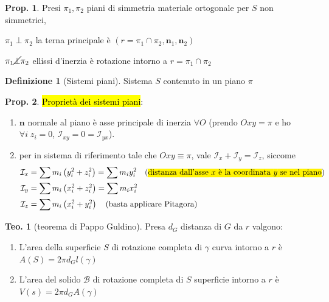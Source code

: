 \documentclass[a4paper,10pt]{article}
\theoremstyle{definition}
\theoremstyle{indentdefinition}
\newtheorem{defn}{Definizione}[section]
\theoremstyle{indenttheorem}
\newtheorem{thm}{Teo.}
\newtheorem{prop}{Prop.}
\theoremstyle{myremark}
\theoremstyle{indentgeneral}
\newenvironment{lyxlist}[1]
	{\begin{list}{}
		{\settowidth{\labelwidth}{#1}
		 \setlength{\leftmargin}{\labelwidth}
		 \addtolength{\leftmargin}{\labelsep}
		 \renewcommand{\makelabel}[1]{##1\hfil}}}
	{\end{list}}
\begin{document}
\begin{prop}
Presi $\pi_{1},\pi_{2}$ piani di simmetria materiale ortogonale per
$S$ non simmetrici,
\end{prop}

\begin{lyxlist}{00.00.0000}
\item [{$\pi_{1}\perp\pi_{2}$}] la terna principale è $\left(r=\pi_{1}\cap\pi_{2},\boldsymbol{n}_{1},\boldsymbol{n}_{2}\right)$
\item [{$\pi_{1}\cancel{\perp}\pi_{2}$}] ellissi d'inerzia è rotazione
intorno a $r=\pi_{1}\cap\pi_{2}$
\end{lyxlist}
\begin{defn}[Sistemi piani]
    Sistema $S$ contenuto in un piano $\pi$
\end{defn}

\begin{prop}
    \hl{Proprietà dei sistemi piani}:
    \begin{enumerate}
        \item $\boldsymbol{n}$ normale al piano è asse principale di inerzia $\forall O$
(prendo $Oxy=\pi$ e ho $\forall i\;z_{i}=0$, $\mathcal{I}_{xy}=0=\mathcal{I}_{yx}$).
\item per in sistema di riferimento
tale che $Oxy\equiv\pi$, vale $\boxed{\mathcal{I}_{x}+\mathcal{I}_{y}=\mathcal{I}_{z}}$,
siccome
\begin{align*}
\mathcal{I}_{x} & =\sum m_{i}\left(y_{i}^{2}+z_{i}^{2}\right)=\sum m_{i}y_{i}^{2} \quad\text{(\hl{distanza dall'asse $x$ è la coordinata $y$ se nel piano})}\\ 
\mathcal{I}_{y} & =\sum m_{i}\left(x_{i}^{2}+z_{i}^{2}\right)=\sum m_{i}x_{i}^2\\ 
\mathcal{I}_{z} & =\sum m_{i}\left(x_{i}^{2}+y_{i}^{2}\right) \quad\text{(basta applicare Pitagora)}
\end{align*}
    \end{enumerate}
\end{prop}


\begin{thm}[teorema di Pappo Guldino]
Presa $d_{G}$ distanza di $G$ da $r$ valgono:
\begin{enumerate}
\item L'area della superficie $S$ di rotazione completa di $\gamma$ curva
intorno a $r$ è $A\left(S\right)=2\pi d_{G}l\left(\gamma\right)$
\item L'area del solido $\mathcal{B}$ di rotazione completa di $S$ superficie
intorno a $r$ è $V\left(s\right)=2\pi d_{G}A\left(\gamma\right)$
\end{enumerate}
\end{thm}
\end{document}
